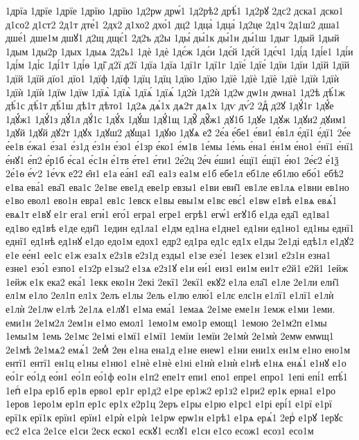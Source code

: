 {1дрїа
1дрїе
1дрїе
1дрїю
1дрїю
1д2рѡ
дрѡ́1
1д2рѣ2
дрѣ́1
1д2рꙋ
2дс2
дска1
дско1
д1со2
д1ст2
2д1т
дте́1
2дх2
д1хо2
дхо́1
дц2
1дца̀
1дца́
1д2це
2д1ч
2д1ш2
дша1
дше́1
дше1м
дшꙋ1
д2щ
дщє́1
2д2ъ
д2ы
1ды́
ды́1к
ды́1н
ды́1ш
1дыг
1дый
1дый
1дым
1ды2р
1дых
1дыѧ
2д2ь1
1дѐ
1дѐ
1дє́ж
1дє́и
1дє́й
1дє́й
1дє́ч1
1ді́д
1ді́е1
1ді́и
1ді́м
1ді́с
1ді́1т
1ді́ѳ
1ді̑
д2ї
д2ї
1дїа
1дїа
1дї1г
1дї1г
1дїе́
1дїе́
1дїи
1дїи
1дїй
1дїй
1дїй
1дїй
дїо1
дїо1
1дїф
1дїф
1дїц
1дїц
1дїю
1дїю
1дїѐ
1дїѐ
1дїѐ
1дїѐ
1дїѝ
1дїѝ
1дїѝ
1дїѝ
1дїѡ
1дїѡ
1дїѧ̀
1дїѧ̀
1дїѧ́
1дїѧ́
1д2ѝ
1д2ѝ
1д2ѡ
дѡ1н
дѡна1
1д2ѣ
дѣ́1ж
дѣ́1с
дѣ́1т
дѣ́1ш
дѣ1т
дѣто1
1д2ѧ
дѧ́1х
дѧ2т
дѧ1х
1дѵ
дѵ́2
2дⷧ
д2ꙋ
1дꙋ́1г
1дꙋ́е
1дꙋ́ж1
1дꙋ́1з
дꙋ́1л
дꙋ́1с
1дꙋ́х
1дꙋ́ш
1дꙋ́1щ
1дꙋ̑
дꙋ̑ж1
дꙋ1б
1дꙋе
1дꙋж
1дꙋи2
дꙋим1
1дꙋй
1дꙋй
дꙋ2т
1дꙋх
1дꙋш2
дꙋща1
1дꙋю
1дꙋѧ
е2́
2е́а
е́бе1
е́ви1
е́в1л
е́дї1
е́дї1
2е́е
е́е1в
е́жа1
е́за1
е́з1д
е́з1н
е́зо1
е́1зр
е́ко1
е́м1в
1е́мы
1е́мь
е́на1
е́н1м
е́но1
е́нї1
е́нї1
е́нꙋ1
е́п2
е́р1б
е́са1
е́с1н
е́1тв
е́те1
е́ти1
2е́2ц
2е́ч
е́ши1
е́щї1
е́щї1
е́ю1
2е́є2
е́1ѯ
2е́1ѳ
е́ѵ2
1е́ѵк
е2̑2
е̑н1
е1а
еа́н1
еа̑1
еа1з
еа1м
е1б
ебе1л
еб1ле
еб1лю
ебо́1
ебѣ2
е1ва
ева́1
ева̑1
ева1с
2е1ве
еве1д
еве1р
евзы1
е1ви
еви̑1
ев1ле
ев1лѧ
е1вни
ев1но
е1во
евол1
ево1н
евра1
ев1с
1евск
е1вы
евы1м
е1вє
евє́1
е1вѡ
е1вѣ
е1вѧ
евѧ́1
евѧ1т
е1вꙋ
е1г
ега1
еги́1
его́1
егра1
егре1
егрѣ1
егѡ́1
егꙋ1б
е1да
еда̑1
ед1ва1
ед1во
ед1вѣ
е1де
еди̑1
1един
ед1ла1
е1дм
ед1на
е1дне1
ед1ни
ед1но1
ед1ны
еднї1
еднї1
ед1нѣ
ед1нꙋ
е1до
едо1м
едох1
едр2
ед1ра
ед1с
ед1х
е1ды
2е1ді
едѣ1л
е1дꙋ2
е1е
ее́н1
ее1с
е1ж
еза1х
е2з1в
е2з1д
езды1
е1зе
езе́1
1езек
е1зи1
е2з1н
езна1
езне1
езо́1
езпо1
е1з2р
е1зы2
е1зѧ
е2з1ꙋ
е1и
еи́1
еиз1
еи1м
еи1т
е2й1
е2й1
1ейж
1ейж
е1к
ека2
ека́1
1екк
еко1н
2екі
2екї1
2екї1
екꙋ2
е1ла
ела̑1
е1ле
2е1ли
ели̑1
ел1м
е1ло
2ел1п
ел1х
2елъ
е1лы
2ель
е1лю
елю́1
е1лє
елє1н
е1лї1
е1лї1
е1лѝ
е1лѝ
2е1лѡ
е1лѣ
2е1лѧ
е1лꙋ1
е1ма
ема́1
1емаѧ
2е1ме
еме1н
1емж
е1ми
1еми.
еми1н
2е1м2л
2ем1н
е1мо
емол1
1емо1м
емо1р
емощ1
1емою
2е1м2п
е1мы
1емы1м
1емь
2е1мє
2е1мі
е1мї1
е1мї1
1емїи
1емїи
2е1мѝ
2е1мѝ
2емѡ
емѡщ1
2е1мѣ
2е1мѧ2
емѧ́1
2емⷣ
2ен
е1на
ена1д
е1не
енеѡ1
е1ни
ени1х
ен1м
е1но
ено1м
ентї1
ентї1
ен1ц
е1ны
е1ню1
е1нѐ
е1нѐ
е1ні
е1нѝ
е1нѝ
е1нѣ
е1нѧ
енѧ́1
е1нꙋ
е1о
ео́1г
ео́1д
ео́н1
ео́1п
ео́1ф
ео1н
е1п2
епе1т
епи1
епо1
епре1
епро1
1епі
епі́1
епѣ́1
1епⷭ
е1ра
ер1б
ер1в
ерво1
ер1г
ер1д2
е1ре
ер1ж2
ер1з2
е1ри2
ер1к
ерна1
е1ро
1еров
1еро1м
ер1п
ер1с
ер1х
е2р1ц
2еръ
е1ры
е1рю
е1рє1
е1рі
ері́1
е1рї
е1рї
ерї1к
ерї1к
ерїн1
ерїн1
е1рѝ
е1рѝ
1е1рѡ
ерѡ1н
е1рѣ1
е1рѧ
ерѧ́1
2ерⷭ
е1рꙋ
1ерꙋс
ес2
е1са
2е1се
е1си
2еск
еско1
ескꙋ1
еслꙋ1
е1сн
е1со
есож1
есоз1
есо1м
}
